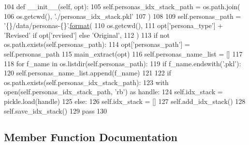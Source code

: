 \begin{DoxyCode}
104     \textcolor{keyword}{def }\_\_init\_\_(self, opt):
105         self.personas\_idx\_stack\_path = os.path.join(
106             os.getcwd(), \textcolor{stringliteral}{'./personas\_idx\_stack.pkl'}
107         )
108 
109         self.personas\_path = \textcolor{stringliteral}{'\{\}/data/personas-\{\}'}.\hyperlink{namespaceparlai_1_1chat__service_1_1services_1_1messenger_1_1shared__utils_a32e2e2022b824fbaf80c747160b52a76}{format}(
110             os.getcwd(),
111             opt[\textcolor{stringliteral}{'persona\_type'}] + \textcolor{stringliteral}{'Revised'} \textcolor{keywordflow}{if} opt[\textcolor{stringliteral}{'revised'}] \textcolor{keywordflow}{else} \textcolor{stringliteral}{'Original'},
112         )
113         \textcolor{keywordflow}{if} \textcolor{keywordflow}{not} os.path.exists(self.personas\_path):
114             opt[\textcolor{stringliteral}{'personas\_path'}] = self.personas\_path
115             main\_extract(opt)
116         self.personas\_name\_list = []
117 
118         \textcolor{keywordflow}{for} f\_name \textcolor{keywordflow}{in} os.listdir(self.personas\_path):
119             \textcolor{keywordflow}{if} f\_name.endswith(\textcolor{stringliteral}{'.pkl'}):
120                 self.personas\_name\_list.append(f\_name)
121 
122         \textcolor{keywordflow}{if} os.path.exists(self.personas\_idx\_stack\_path):
123             with open(self.personas\_idx\_stack\_path, \textcolor{stringliteral}{'rb'}) \textcolor{keyword}{as} handle:
124                 self.idx\_stack = pickle.load(handle)
125         \textcolor{keywordflow}{else}:
126             self.idx\_stack = []
127             self.add\_idx\_stack()
128             self.save\_idx\_stack()
129         \textcolor{keywordflow}{pass}
130 
\end{DoxyCode}


\subsection{Member Function Documentation}
\mbox{\label{classparlai_1_1mturk_1_1tasks_1_1convai2__model__eval_1_1worlds_1_1PersonasGenerator_aa6d41d88d84d5db2a35a759e137da157}} 
